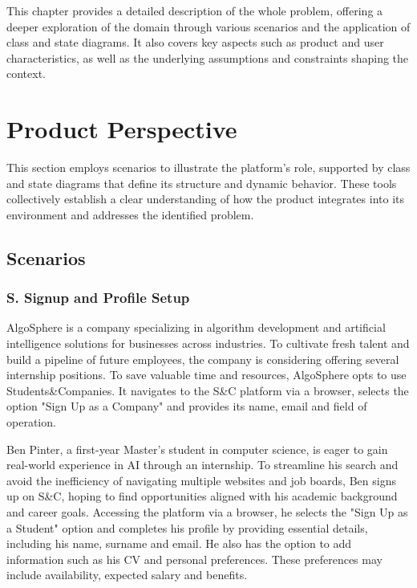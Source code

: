 This chapter provides a detailed description of the whole problem, offering a deeper exploration of the domain through various scenarios and the application of class and state diagrams.
It also covers key aspects such as product and user characteristics, as well as the underlying assumptions and constraints shaping the context.

\section{Product Perspective}
This section employs scenarios to illustrate the platform's role, supported by class and state diagrams that define its structure and dynamic behavior.
These tools collectively establish a clear understanding of how the product integrates into its environment and addresses the identified problem.

\subsection{Scenarios}
\setcounter{s}{1}
\newcommand{\sco}{\thes{}}

\subsubsection*{S\sco. Signup and Profile Setup}
AlgoSphere is a company specializing in algorithm development and artificial intelligence solutions for businesses across industries.
To cultivate fresh talent and build a pipeline of future employees, the company is considering offering several internship positions.
To save valuable time and resources, AlgoSphere opts to use Students\&Companies.
It navigates to the S\&C platform via a browser, selects the option "Sign Up as a Company"
and provides its name, email and field of operation.

Ben Pinter, a first-year Master's student in computer science, is eager to gain real-world experience in AI through an internship.
To streamline his search and avoid the inefficiency of navigating multiple websites and job boards, Ben signs up on S\&C, hoping to find opportunities aligned with his academic background and career goals.
Accessing the platform via a browser, he selects the "Sign Up as a Student" option and completes his profile by providing essential details, including his name, surname and email.
He also has the option to add information such as his CV and personal preferences.
These preferences may include availability, expected salary and benefits.

